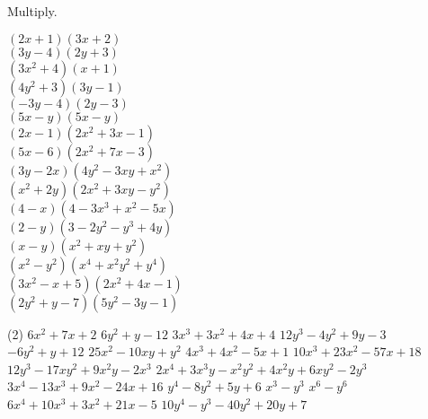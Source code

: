 \documentclass[12pt,fleqn]{book}
\newcommand{\prb}[1]{\begin{Exercise}#1\end{Exercise}}
\newcommand{\sol}[1]{\begin{Answer}#1\end{Answer}}
\begin{document}
\prb {Multiply.
    \begin{tasks}
\task $(2 x+1)(3 x+2)$
		\\[5em]
\task $(3 y-4)(2 y+3)$
		\\[5em]
\task $\left(3 x^2+4\right)(x+1)$
		\\[5em]
\task $\left(4 y^2+3\right)(3 y-1)$
		\\[5em]
\task $(-3 y-4)(2 y-3)$
		\\[5em]
\task $(5 x-y)(5 x-y)$
		\\[5em]
\task $(2 x-1)\left(2 x^2+3 x-1\right)$
		\\[5em]
\task $(5 x-6)\left(2 x^2+7 x-3\right)$
		\\[5em]
\task $(3 y-2 x)\left(4 y^2-3 x y+x^2\right)$
		\\[5em]
\task $\left(x^2+2 y\right)\left(2 x^2+3 x y-y^2\right)$
		\\[5em]
\task $(4-x)\left(4-3 x^3+x^2-5 x\right)$
		\\[5em]
\task $(2-y)\left(3-2 y^2-y^3+4 y\right)$
		\\[5em]
\task $(x-y)\left(x^2+x y+y^2\right)$
		\\[5em]
\task $\left(x^2-y^2\right)\left(x^4+x^2 y^2+y^4\right)$
		\\[5em]
\task $\left(3 x^2-x+5\right)\left(2 x^2+4 x-1\right)$
		\\[5em]
\task $\left(2 y^2+y-7\right)\left(5 y^2-3 y-1\right)$
		\\[5em]
\end{tasks}
}
\sol{
    \begin{tasks}(2)
\task $6 x^2+7 x+2$
\task $6 y^2+y-12$
\task $3 x^3+3 x^2+4 x+4$
\task $12 y^3-4 y^2+9 y-3$
\task $-6 y^2+y+12$
\task $25 x^2-10 x y+y^2$
\task $4 x^3+4 x^2-5 x+1$
\task $10 x^3+23 x^2-57 x+18$
\task $12 y^3-17 x y^2+9 x^2 y-2 x^3$
\task $2 x^4+3 x^3 y-x^2 y^2+4 x^2 y+6 x y^2-2 y^3$
\task $3 x^4-13 x^3+9 x^2-24 x+16$
\task $y^4-8 y^2+5 y+6$
\task $x^3-y^3$
\task $x^6-y^6$
\task $6 x^4+10 x^3+3 x^2+21 x-5$
\task $10 y^4-y^3-40 y^2+20 y+7$
\end{tasks}
}
\end{document}
